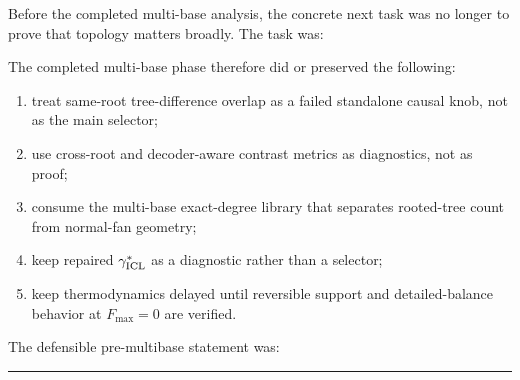 \documentclass[11pt]{article}
\begin{document}
\vspace{0.5em}
\noindent Before the completed multi-base analysis, the concrete next task was no longer to prove that topology matters broadly. The task was:
\begin{center}
\end{center}

\vspace{0.5em}
\noindent The completed multi-base phase therefore did or preserved the following:
\begin{enumerate}
\item treat same-root tree-difference overlap as a failed standalone causal knob, not as the main selector;
\item use cross-root and decoder-aware contrast metrics as diagnostics, not as proof;
\item consume the multi-base exact-degree library that separates rooted-tree count from normal-fan geometry;
\item keep repaired $\gamma^\ast_{\rm ICL}$ as a diagnostic rather than a selector;
\item keep thermodynamics delayed until reversible support and detailed-balance behavior at $F_{\max}=0$ are verified.
\end{enumerate}

\vspace{0.5em}
\noindent The defensible pre-multibase statement was:
\begin{center}
\end{center}

\clearpage

\vspace{1em}
\noindent\rule{\textwidth}{0.4pt}
\vspace{1em}
\end{document}
